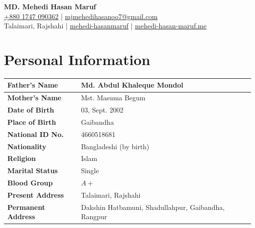 \documentclass[10pt, a4paper]{article}
\newcommand{\appliedpost}{Management Trainee Officer}
\begin{document}
\color{primary}

\begin{center}
    {\Huge\bfseries\color{primary} MD. Mehedi Hasan Maruf}\\[0.35em]
    \faPhone* \href{tel:+8801747090362}{+880 1747 090362} \quad|\quad
    \faEnvelope \href{mailto:mjmehedihasanoo7@gmail.com}{\hspace{0.5mm}mjmehedihasanoo7@gmail.com} \\[0.25em]
    \faMapMarker \hspace{1mm} Talaimari, Rajshahi \quad|\quad
    \faLinkedin \href{https://www.linkedin.com/in/mehedi-hasanmaruf}{\hspace{0.5mm}mehedi-hasanmaruf} \quad|\quad
    \faGlobe \href{https://www.mehedi-hasan-maruf.me/}{\hspace{0.5mm}mehedi-hasan-maruf.me}
\end{center}


\section{Personal Information}
\renewcommand{\arraystretch}{1.35}
\setlength{\tabcolsep}{6pt}
\begin{tabularx}{\textwidth}{|>{\bfseries}p{}|X|}
\hline
Father's Name & Md. Abdul Khaleque Mondol \\
\hline
Mother's Name & Mst. Masuma Begum \\
\hline
Date of Birth & 03, Sept. 2002 \\
\hline
Place of Birth & Gaibandha \\
\hline
National ID No. & 4660518681 \\
\hline
Nationality & Bangladeshi (by birth) \\
\hline
Religion & Islam \\
\hline
Marital Status & Single \\
\hline
Blood Group & $A+$ \\
\hline
Present Address & Talaimari, Rajshahi \\
\hline
Permanent Address & Dakshin Hatbamuni, Shadullahpur, Gaibandha, Rangpur \\
\hline
\end{tabularx}
\end{document}

